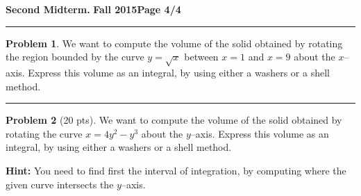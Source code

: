 \documentclass[12pt]{article}
\theoremstyle{definition}
\newtheorem{problem}{Problem}
\begin{document}
\hfill{\large\bf Second Midterm.}\hfill{\large\bf
  Fall 2015}\hfill{\large\bf Page 4/4}\hrule

\bigskip
\begin{problem}
We want to compute the volume of the solid obtained by rotating the region bounded by the curve $y=\sqrt{x}$ between $x=1$ and $x=9$ about the $x$--axis.  Express this volume as an integral, by using either a washers or a shell method.
\vspace{7cm}
\begin{flushright}
\end{flushright}
\end{problem}
\hrule
\begin{problem}[20 pts]
We want to compute the volume of the solid obtained by rotating the curve $x=4y^2-y^3$ about the $y$--axis.  Express this volume as an integral, by using either a washers or a shell method.

\noindent\textbf{Hint:} You need to find first the interval of integration, by computing where the given curve intersects the $y$--axis.
\vspace{8.5cm}
\begin{flushright}
\end{flushright}
\end{problem}
\end{document}
